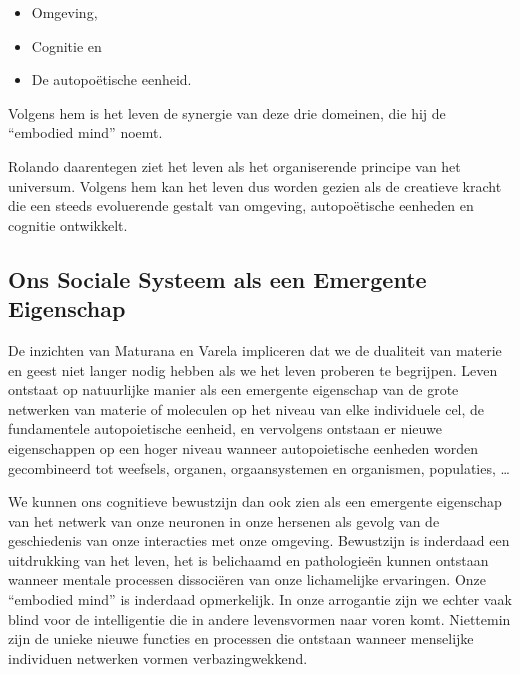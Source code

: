 \documentclass[
  11pt,
]{book}
\providecommand{\tightlist}{%
  \setlength{\itemsep}{0pt}\setlength{\parskip}{0pt}}
\begin{document}
\begin{itemize}
\tightlist
\item
  Omgeving,
\item
  Cognitie en
\item
  De autopoëtische eenheid.
\end{itemize}

Volgens hem is het leven de synergie van deze drie domeinen, die hij de ``embodied mind'' noemt.

Rolando daarentegen ziet het leven als het organiserende principe van het universum. Volgens hem kan het leven dus worden gezien als de creatieve kracht die een steeds evoluerende gestalt van omgeving, autopoëtische eenheden en cognitie ontwikkelt.

\pagebreak

\hypertarget{ons-sociale-systeem-als-een-emergente-eigenschap}{%
\subsection{Ons Sociale Systeem als een Emergente Eigenschap}\label{ons-sociale-systeem-als-een-emergente-eigenschap}}

De inzichten van Maturana en Varela impliceren dat we de dualiteit van materie en geest niet langer nodig hebben als we het leven proberen te begrijpen. Leven ontstaat op natuurlijke manier als een emergente eigenschap van de grote netwerken van materie of moleculen op het niveau van elke individuele cel, de fundamentele autopoietische eenheid, en vervolgens ontstaan er nieuwe eigenschappen op een hoger niveau wanneer autopoietische eenheden worden gecombineerd tot weefsels, organen, orgaansystemen en organismen, populaties, \ldots{}

We kunnen ons cognitieve bewustzijn dan ook zien als een emergente eigenschap van het netwerk van onze neuronen in onze hersenen als gevolg van de geschiedenis van onze interacties met onze omgeving. Bewustzijn is inderdaad een uitdrukking van het leven, het is belichaamd en pathologieën kunnen ontstaan wanneer mentale processen dissociëren van onze lichamelijke ervaringen. Onze ``embodied mind'' is inderdaad opmerkelijk. In onze arrogantie zijn we echter vaak blind voor de intelligentie die in andere levensvormen naar voren komt. Niettemin zijn de unieke nieuwe functies en processen die ontstaan wanneer menselijke individuen netwerken vormen verbazingwekkend.
\end{document}
